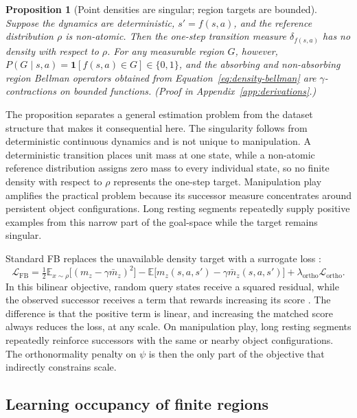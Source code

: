 \documentclass{article}
\newcommand{\E}{\mathbb{E}}
\newcommand{\ind}[1]{\mathbf{1}\!\left[#1\right]}
\newtheorem{proposition}{Proposition}
\begin{document}
\begin{proposition}[Point densities are singular; region targets are bounded]
\label{prop:fixed-points}
Suppose the dynamics are deterministic, $s'=f(s,a)$, and the reference distribution $\rho$ is non-atomic.
Then the one-step transition measure $\delta_{f(s,a)}$ has no density with respect to $\rho$.
For any measurable region $G$, however, $P(G\mid s,a)=\ind{f(s,a)\in G}\in\{0,1\}$, and the absorbing and non-absorbing region Bellman operators obtained from Equation~\ref{eq:density-bellman} are $\gamma$-contractions on bounded functions.
(Proof in Appendix~\ref{app:derivations}.)
\end{proposition}

The proposition separates a general estimation problem from the dataset structure that makes it consequential here.
The singularity follows from deterministic continuous dynamics and is not unique to manipulation.
A deterministic transition places unit mass at one state, while a non-atomic reference distribution assigns zero mass to every individual state, so no finite density with respect to $\rho$ represents the one-step target.
Manipulation play amplifies the practical problem because its successor measure concentrates around persistent object configurations.
Long resting segments repeatedly supply positive examples from this narrow part of the goal-space while the target remains singular.

Standard FB replaces the unavailable density target with a surrogate loss \citep{touati2021learning}:
\begin{equation}
\label{eq:fb-loss}
\mathcal{L}_{\mathrm{FB}}
=
\tfrac{1}{2}\E_{x\sim\rho}\big[(m_z-\gamma\bar m_z)^2\big]
-
\E\big[m_z(s,a,s')-\gamma\bar m_z(s,a,s')\big]
+
\lambda_{\mathrm{ortho}}\mathcal{L}_{\mathrm{ortho}}.
\end{equation}
In this bilinear objective, random query states receive a squared residual, while the observed successor receives a term that rewards increasing its score \citep{eysenbach2022contrastive}.
The difference is that the positive term is linear, and increasing the matched score always reduces the loss, at any scale.
On manipulation play, long resting segments repeatedly reinforce successors with the same or nearby object configurations.
The orthonormality penalty on $\psi$ is then the only part of the objective that indirectly constrains scale.

\subsection{Learning occupancy of finite regions}
\label{sec:regions}
\end{document}
